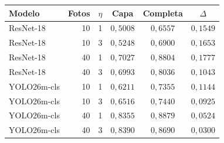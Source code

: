 \begin{tabular}{lrrccc}\toprule
Modelo & Fotos & $\eta$ & Capa & Completa & $\Delta$\\\midrule
ResNet-18 & 10 & 1 & $0{,}5008$ & $0{,}6557$ & $0{,}1549$ \\
ResNet-18 & 10 & 3 & $0{,}5248$ & $0{,}6900$ & $0{,}1653$ \\
ResNet-18 & 40 & 1 & $0{,}7027$ & $0{,}8804$ & $0{,}1777$ \\
ResNet-18 & 40 & 3 & $0{,}6993$ & $0{,}8036$ & $0{,}1043$ \\
YOLO26m-cls & 10 & 1 & $0{,}6211$ & $0{,}7355$ & $0{,}1144$ \\
YOLO26m-cls & 10 & 3 & $0{,}6516$ & $0{,}7440$ & $0{,}0925$ \\
YOLO26m-cls & 40 & 1 & $0{,}8355$ & $0{,}8879$ & $0{,}0524$ \\
YOLO26m-cls & 40 & 3 & $0{,}8390$ & $0{,}8690$ & $0{,}0300$ \\
\bottomrule\end{tabular}

